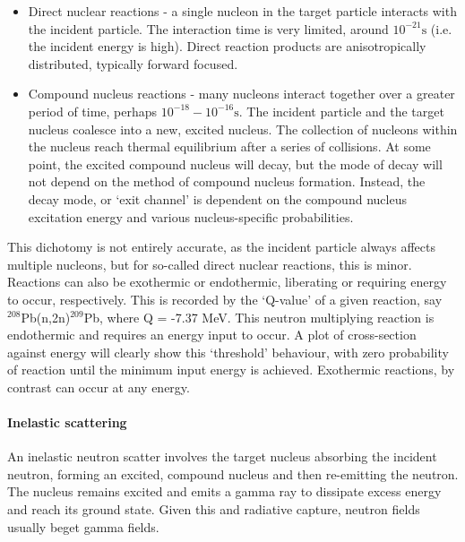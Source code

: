 \begin{itemize}
  \item Direct nuclear reactions - a single nucleon in the target particle interacts with the incident particle. The interaction time is very limited, around $10^{-21}\mathrm{s}$ (i.e. the incident energy is high). Direct reaction products are anisotropically distributed, typically forward focused.
  \item Compound nucleus reactions - many nucleons interact together over a greater period of time, perhaps $10^{-18} - 10^{-16}\mathrm{s}$. The incident particle and the target nucleus coalesce into a new, excited nucleus. The collection of nucleons within the nucleus reach thermal equilibrium after a series of collisions. At some point, the excited compound nucleus will decay, but the mode of decay will not depend on the method of compound nucleus formation. Instead, the decay mode, or `exit channel' is dependent on the compound nucleus excitation energy and various nucleus-specific probabilities. 
\end{itemize} 

This dichotomy is not entirely accurate, as the incident particle always affects multiple nucleons, but for so-called direct nuclear reactions, this is minor. Reactions can also be exothermic or endothermic, liberating or requiring energy to occur, respectively. This is recorded by the `Q-value' of a given reaction, say $^{208}$Pb(n,2n)$^{209}$Pb, where Q = -7.37 MeV. This neutron multiplying reaction is endothermic and requires an energy input to occur. A plot of cross-section against energy will clearly show this `threshold' behaviour, with zero probability of reaction until the minimum input energy is achieved. Exothermic reactions, by contrast can occur at any energy.


\paragraph{Inelastic scattering}
An inelastic neutron scatter involves the target nucleus absorbing the incident neutron, forming an excited, compound nucleus and then re-emitting the neutron. The nucleus remains excited and emits a gamma ray to dissipate excess energy and reach its ground state. Given this and radiative capture, neutron fields usually beget gamma fields.

